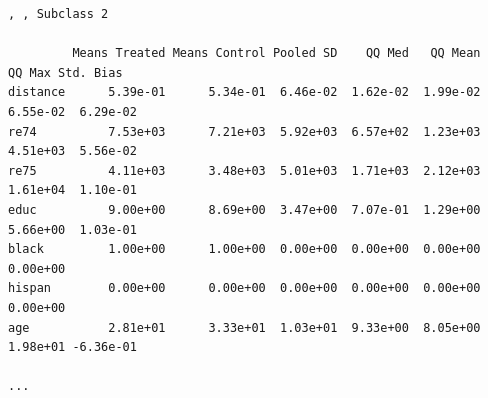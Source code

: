 \documentclass[oneside,letterpaper,titlepage]{article}
\begin{document}
\begin{enumerate}
\begin{verbatim}
, , Subclass 2

         Means Treated Means Control Pooled SD    QQ Med   QQ Mean    QQ Max Std. Bias
distance      5.39e-01      5.34e-01  6.46e-02  1.62e-02  1.99e-02  6.55e-02  6.29e-02
re74          7.53e+03      7.21e+03  5.92e+03  6.57e+02  1.23e+03  4.51e+03  5.56e-02
re75          4.11e+03      3.48e+03  5.01e+03  1.71e+03  2.12e+03  1.61e+04  1.10e-01
educ          9.00e+00      8.69e+00  3.47e+00  7.07e-01  1.29e+00  5.66e+00  1.03e-01
black         1.00e+00      1.00e+00  0.00e+00  0.00e+00  0.00e+00  0.00e+00          
hispan        0.00e+00      0.00e+00  0.00e+00  0.00e+00  0.00e+00  0.00e+00          
age           2.81e+01      3.33e+01  1.03e+01  9.33e+00  8.05e+00  1.98e+01 -6.36e-01
        
...
\end{verbatim}

\end{enumerate}
\end{document}
